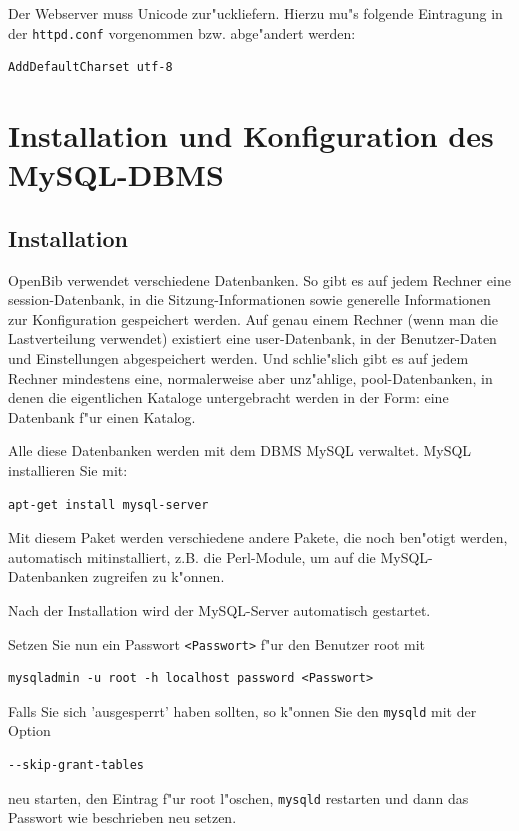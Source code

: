 \documentclass[11pt, twoside, a4paper, BCOR8mm, DIV12, bibtotoc,idxtotoc]{scrbook}
\begin{document}
Der Webserver muss Unicode zur"uckliefern. Hierzu mu"s folgende
Eintragung in der \texttt{httpd.conf} vorgenommen bzw. abge"andert
werden:

\begin{verbatim}
AddDefaultCharset utf-8
\end{verbatim}

\section{Installation und Konfiguration des MySQL-DBMS}
\label{sec:instmysql}


\subsection{Installation}

OpenBib verwendet verschiedene Datenbanken. So gibt es auf jedem
Rechner eine session-Datenbank, in die Sitzung-Informationen sowie
generelle Informationen zur Konfiguration gespeichert werden. Auf
genau einem Rechner (wenn man die Lastverteilung verwendet) existiert
eine user-Datenbank, in der Benutzer-Daten und Einstellungen
abgespeichert werden. Und schlie"slich gibt es auf jedem Rechner
mindestens eine, normalerweise aber unz"ahlige, pool-Datenbanken, in
denen die eigentlichen Kataloge untergebracht werden in der Form: eine
Datenbank f"ur einen Katalog.

Alle diese Datenbanken werden mit dem DBMS MySQL verwaltet. MySQL
installieren Sie mit:

\begin{verbatim}
apt-get install mysql-server
\end{verbatim}

Mit diesem Paket werden verschiedene andere Pakete, die noch ben"otigt
werden, automatisch mitinstalliert, z.B. die Perl-Module, um auf die
MySQL-Datenbanken zugreifen zu k"onnen.

Nach der Installation wird der MySQL-Server automatisch gestartet.

Setzen Sie nun ein Passwort \texttt{<Passwort>} f"ur den Benutzer root mit

\begin{verbatim}
mysqladmin -u root -h localhost password <Passwort>
\end{verbatim}

Falls Sie sich 'ausgesperrt' haben sollten, so k"onnen Sie den
\texttt{mysqld} mit der Option
\begin{verbatim}
--skip-grant-tables
\end{verbatim}
neu starten, den Eintrag f"ur root l"oschen, \texttt{mysqld} restarten
und dann das Passwort wie beschrieben neu setzen.
\end{document}
